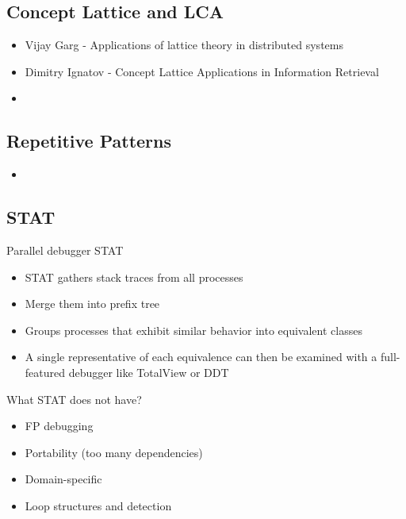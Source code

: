 \subsection{Concept Lattice and LCA}


\begin{itemize}
\item Vijay Garg - Applications of lattice theory in distributed systems

\item Dimitry Ignatov \cite{ignatov} - Concept Lattice Applications in Information Retrieval

\item \cite{clbook} \cite{clconst} \cite{bender05} \cite{latticeForDistConst} \cite{diff-myers}
\end{itemize}

\subsection{Repetitive Patterns}


\begin{itemize}
\item \cite{kmruse} \cite{kmr} \cite{nakamura_fast_2013} \cite{crochemore_jewels_2002} \cite{Crochemore:1994:TA:199269}
\end{itemize}


\subsection{STAT}

Parallel debugger STAT\cite{stat}
\begin{itemize}
\item STAT gathers stack traces from all processes
\item Merge them into prefix tree
\item Groups processes that exhibit similar behavior into equivalent classes
\item A single representative of each equivalence can then be examined with a full-featured debugger like TotalView or DDT
\end{itemize}

What STAT does not have?

\begin{itemize}
\item FP debugging
\item Portability (too many dependencies)
\item Domain-specific
\item Loop structures and detection
\end{itemize}